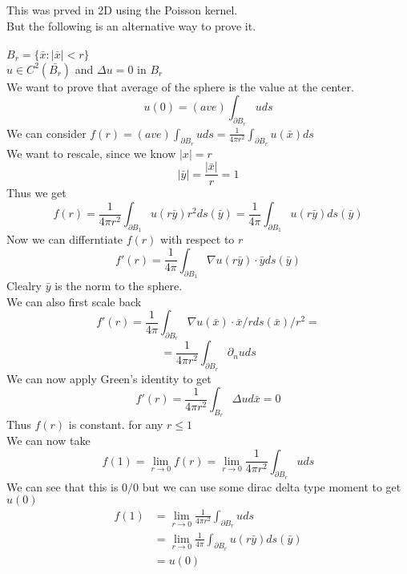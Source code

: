 \documentclass[answers,12pt,addpoints]{exam}
\begin{document}
\begin{theorem}
    This was prved in 2D using the Poisson kernel.\\
    But the following is an alternative way to prove it.\\\\
    $B_r = \{\bar{x} : |\bar{x}| < r\}$\\ 
    $u \in C^2(\bar{B_r})$ and $\Delta u = 0$ in $B_r$\\
    We want to prove that average of the sphere is the value at the center.\\
    $$u(0) = (ave) \int_{\partial B_r} u ds$$
    We can consider $f(r) = (ave) \int_{\partial B_r} u ds = \frac{1}{4\pi r^2}\int_{\partial B_r} u(\bar{x}) ds$ \\
    We want to rescale, since we know $|x| = r$\\
    $$ |\bar{y}| = \frac{|\bar{x}|}{r} = 1$$
    Thus we get 
    $$ f(r) = \frac{1}{4\pi r^2} \int_{\partial B_1} u(r\bar{y}) r^2 ds(\bar{y}) = \frac{1}{4\pi} \int_{\partial B_1} u(r\bar{y}) ds(\bar{y})$$
    Now we can differntiate $f(r)$ with respect to $r$
    $$f'(r) = \frac{1}{4\pi} \int_{\partial B_1} \nabla u(r\bar{y}) \cdot \bar{y} ds(\bar{y})$$
    Clealry $\bar{y}$ is the norm to the sphere.\\
    We can also first scale back\\
    $$f'(r) = \frac{1}{4\pi} \int_{\partial B_r} \nabla u(\bar{x}) \cdot \bar{x}/r ds(\bar{x}) / r^2= $$ 
    $$ = \frac{1}{4\pi r^2} \int_{\partial B_r} \partial_n u ds$$
    We can now apply Green's identity to get
    $$f'(r) = \frac{1}{4\pi r^2} \int_{B_r} \Delta u d\bar{x} = 0$$
    Thus $f(r)$ is constant. for any $r \leq 1$\\
    We can now take $$f(1) = \lim_{r \to 0} f(r) = \lim_{r \to 0} \frac{1}{4\pi r^2} \int_{\partial B_r} u ds$$
    We can see that this is $0/0$ but we can use some dirac delta type moment to get $u(0)$
    \begin{align*}
        f(1) &= \lim_{r \to 0} \frac{1}{4\pi r^2} \int_{\partial B_r} u ds\\
        &= \lim_{r \to 0} \frac{1}{4\pi } \int_{\partial B_r} u(r\bar{y}) ds(\bar{y})\\
        &= u(0)
    \end{align*}
\end{theorem}
\end{document}
